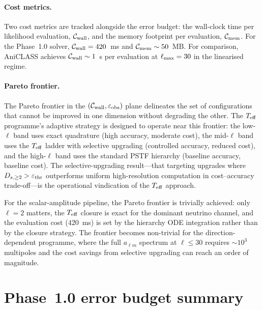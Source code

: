 \paragraph{Cost metrics.}

Two cost metrics are tracked alongside the error budget:
the wall-clock time per likelihood evaluation,
$\mathcal{C}_{\rm wall}$, and the memory footprint per
evaluation, $\mathcal{C}_{\rm mem}$.  For the Phase~1.0
solver, $\mathcal{C}_{\rm wall} = 420$~ms and
$\mathcal{C}_{\rm mem} \sim 50$~MB.  For comparison,
AniCLASS achieves $\mathcal{C}_{\rm wall} \sim 1$~s per
evaluation at $\ell_{\rm max} = 30$ in the linearised
regime.


\paragraph{Pareto frontier.}

The Pareto frontier in the
$(\mathcal{C}_{\rm wall}, \varepsilon_{\rm obs})$ plane
delineates the set of configurations that cannot be
improved in one dimension without degrading the other.
The $T_{\mathrm{eff}}$ programme's adaptive strategy is designed to
operate near this frontier: the low-$\ell$ band uses
exact quadrature (high accuracy, moderate cost), the
mid-$\ell$ band uses the $T_{\mathrm{eff}}$ ladder with selective
upgrading (controlled accuracy, reduced cost), and the
high-$\ell$ band uses the standard PSTF hierarchy
(baseline accuracy, baseline cost).  The selective-upgrading
result---that targeting upgrades where
$D_{s,\geq 2} > \varepsilon_{\rm thr}$ outperforms
uniform high-resolution computation in cost--accuracy
trade-off---is the operational vindication of the $T_{\mathrm{eff}}$
approach.

For the scalar-amplitude pipeline, the Pareto frontier is
trivially achieved: only $\ell = 2$ matters, the
$T_{\mathrm{eff}}$ closure is exact for the dominant neutrino
channel, and the evaluation cost ($420$~ms) is set by
the hierarchy ODE integration rather than by the
closure strategy.  The frontier becomes non-trivial for
the direction-dependent programme, where the full
$a_{\ell m}$ spectrum at $\ell \leq 30$ requires
$\sim\!10^3$ multipoles and the cost savings from
selective upgrading can reach an order of magnitude.


\section{Phase~1.0 error budget summary}
\label{sec:err-phase10-budget}


